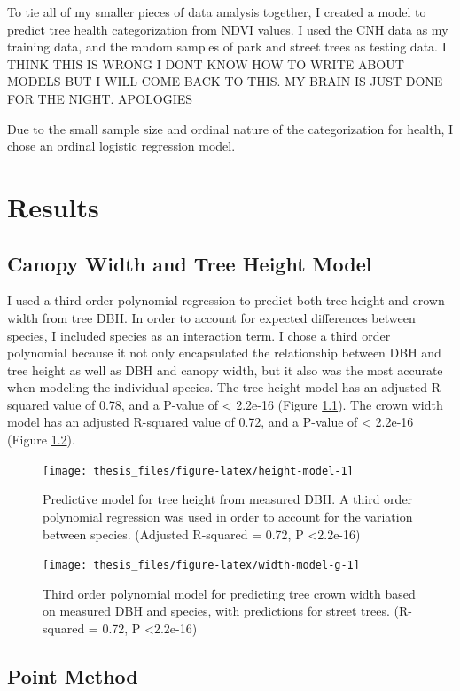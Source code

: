 \documentclass[12pt,twoside]{reedthesis}
\begin{document}
To tie all of my smaller pieces of data analysis together, I created a model to predict tree health categorization from NDVI values. I used the CNH data as my training data, and the random samples of park and street trees as testing data. I THINK THIS IS WRONG I DONT KNOW HOW TO WRITE ABOUT MODELS BUT I WILL COME BACK TO THIS. MY BRAIN IS JUST DONE FOR THE NIGHT. APOLOGIES

Due to the small sample size and ordinal nature of the categorization for health, I chose an ordinal logistic regression model.

\hypertarget{results}{%
\chapter{Results}\label{results}}

\hypertarget{canopy-width-and-tree-height-model-1}{%
\section{Canopy Width and Tree Height Model}\label{canopy-width-and-tree-height-model-1}}

I used a third order polynomial regression to predict both tree height and crown width from tree DBH. In order to account for expected differences between species, I included species as an interaction term. I chose a third order polynomial because it not only encapsulated the relationship between DBH and tree height as well as DBH and canopy width, but it also was the most accurate when modeling the individual species.
The tree height model has an adjusted R-squared value of 0.78, and a P-value of \textless{} 2.2e-16 (Figure \ref{fig:height-model}). The crown width model has an adjusted R-squared value of 0.72, and a P-value of \textless{} 2.2e-16 (Figure \ref{fig:width-model-g}).
\begin{figure}
\texttt{[image: thesis\_files/figure-latex/height-model-1]} \caption[Tree height predictive model]{Predictive model for tree height from measured DBH. A third order polynomial regression was used in order to account for the variation between species. (Adjusted R-squared = 0.72, P <2.2e-16)}\label{fig:height-model}
\end{figure}
\begin{figure}
\texttt{[image: thesis\_files/figure-latex/width-model-g-1]} \caption[Crown width predictive model]{Third order polynomial model for predicting tree crown width based on measured DBH and species, with predictions for street trees. (R-squared = 0.72,  P <2.2e-16)}\label{fig:width-model-g}
\end{figure}
\hypertarget{point-method-1}{%
\section{Point Method}\label{point-method-1}}
\end{document}
